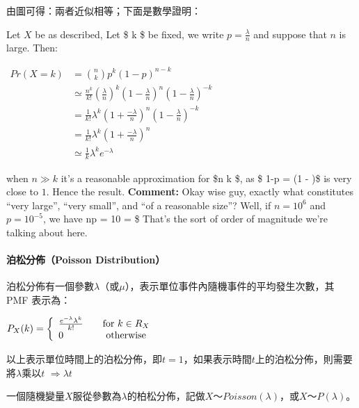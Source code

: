 \documentclass[11pt]{article}
\begin{document}
    由圖可得：兩者近似相等；下面是數學證明：

Let \(X\) be as described, Let \$ k \$ be fixed, we write
\(p = \frac{\lambda}{n}\) and suppose that \(n\) is large. Then:

\(\begin{align*}  Pr(X = k) &= \binom n k p^k \left({1 - p}\right)^{n-k} \\& \simeq \frac {n^k} {k!} \left({\frac \lambda n}\right)^k \left({1 - \frac \lambda n}\right)^n \left({1 - \frac \lambda n}\right)^{-k} \\ &= \frac 1 {k!} \lambda^k \left({1 + \frac {-\lambda} n}\right)^n \left({1 - \frac \lambda n}\right)^{-k} \\ &= \frac 1 {k!} \lambda^k \left({1 + \frac {-\lambda} n}\right)^n \\ &\simeq \frac{1}{k}\lambda^k e^{-\lambda} \end{align*}\)

when \(n \gg k\) it's a reasonable approximation for \$\binom n k \$, as
\$ 1-p = (1 - )\$ is very close to \(1\). Hence the
result. \textbf{Comment:} Okay wise guy, exactly what constitutes ``very
large'', ``very small'', and ``of a reasonable size''? Well, if
\(n = 10^6\) and \(p = 10^{-5}\), we have np = 10 = \lambda\$ That's the
sort of order of magnitude we're talking about here.

    \hypertarget{ux6ccaux677eux5206ux4f48poisson-distribution}{%
\paragraph{泊松分佈（Poisson
Distribution）}\label{ux6ccaux677eux5206ux4f48poisson-distribution}}

泊松分佈有一個參數\(\lambda\)（或\(\mu\)），表示單位事件內隨機事件的平均發生次數，其
PMF 表示為：

\(\begin{equation}\nonumber P_X(k) = \left\{\begin{array}{l l}\frac{e^{-\lambda} \lambda^k}{k!}& \quad \text{for  } k \in R_X\\ 0 & \quad \text{ otherwise} \end{array} \right. \end{equation}\)

以上表示單位時間上的泊松分佈，即\(t = 1\)，如果表示時間\(t\)上的泊松分佈，則需要將\(\lambda\)乘以\(t\)
\(\Rightarrow\lambda t\)

一個隨機變量\(X\)服從參數為\(\lambda\)的柏松分佈，記做\(X～Poisson(\lambda)\)，或\(X～P(\lambda)\)。
\end{document}

